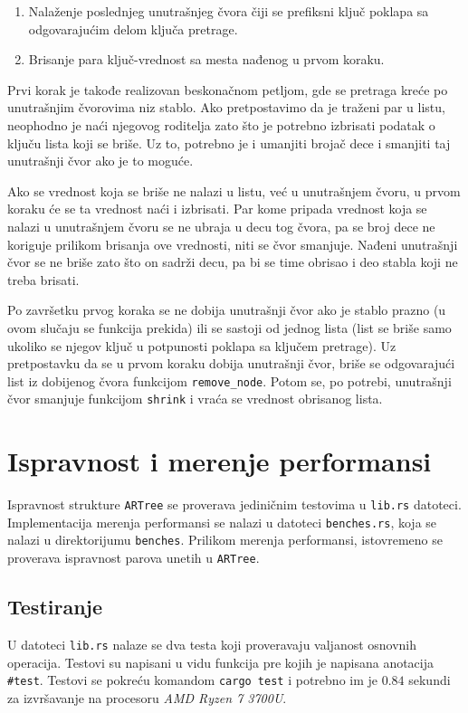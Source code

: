 \documentclass[12pt,oneside]{memoir}
\begin{document}
\begin{enumerate}
  \item Nalaženje poslednjeg unutrašnjeg čvora čiji se prefiksni ključ
        poklapa sa odgovarajućim delom ključa pretrage.
  \item Brisanje para ključ-vrednost sa mesta nađenog u prvom koraku.
\end{enumerate}

Prvi korak je takođe realizovan beskonačnom petljom, gde se pretraga
kreće po unutrašnjim čvorovima niz stablo. Ako pretpostavimo da je
traženi par u listu, neophodno je naći njegovog roditelja zato što
je potrebno izbrisati podatak o ključu lista koji se briše.
Uz to, potrebno je i umanjiti brojač dece i smanjiti taj
unutrašnji čvor ako je to moguće.

Ako se vrednost koja se briše
ne nalazi u listu, već u unutrašnjem čvoru, u prvom koraku
će se ta vrednost naći i izbrisati.
Par kome pripada vrednost koja se nalazi u unutrašnjem čvoru
se ne ubraja u decu tog čvora,
pa se broj dece ne koriguje prilikom brisanja ove vrednosti, niti
se čvor smanjuje.
Nađeni unutrašnji čvor se ne briše zato što on sadrži
decu, pa bi se time obrisao i deo stabla koji ne treba
brisati.

Po završetku prvog koraka se ne dobija unutrašnji čvor ako je
stablo prazno (u ovom slučaju se funkcija prekida) ili se
sastoji od jednog lista (list se briše samo ukoliko se njegov ključ
u potpunosti poklapa sa ključem pretrage). Uz pretpostavku da se u prvom
koraku dobija unutrašnji čvor, briše se odgovarajući list iz dobijenog
čvora funkcijom \texttt{remove\_node}. Potom se, po potrebi,
unutrašnji čvor smanjuje funkcijom \texttt{shrink}
i vraća se vrednost obrisanog lista.

\section{Ispravnost i merenje performansi}
Ispravnost strukture \texttt{ARTree} se
proverava jediničnim testovima u \texttt{lib.rs} datoteci.
Implementacija merenja performansi se nalazi u
datoteci \texttt{benches.rs}, koja se nalazi u
direktorijumu \texttt{benches}.
Prilikom merenja performansi, istovremeno se proverava
ispravnost parova unetih u \texttt{ARTree}.

\subsection{Testiranje}
U datoteci \texttt{lib.rs} nalaze se dva testa koji proveravaju
valjanost osnovnih operacija. Testovi su napisani u vidu funkcija
pre kojih je napisana anotacija \texttt{\#\lbrack test\rbrack}.
Testovi se pokreću komandom \texttt{cargo test} i potrebno
im je $0.84$ sekundi za izvršavanje na procesoru
\textit{AMD Ryzen 7 3700U}.
\end{document}
